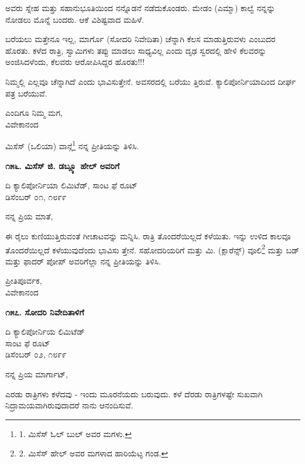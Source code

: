 ಅವರು ಸ್ನೇಹ ಮತ್ತು ಸಹಾನುಭೂತಿಯಿಂದ ನನ್ನೊಡನೆ ನಡೆದುಕೊಂಡರು. ಮೇಡಂ (ಎಮ್ಮಾ) ಕಾಲ್ವೆ ನನ್ನನ್ನು ನೋಡಲು ಮೊನ್ನೆ ಬಂದರು. ಆಕೆ ವಿಶಿಷ್ಟವಾದ ಮಹಿಳೆ.

ಬರೆಯಲು ಮತ್ತೇನೂ ಇಲ್ಲ, ಮಾರ್ಗೊ (ಸೋದರಿ ನಿವೇದಿತಾ) ಚೆನ್ನಾಗಿ ಕೆಲಸ ಮಾಡುತ್ತಿರುವಳು ಎಂಬುದರ ಹೊರತು. ಕಳೆದ ರಾತ್ರಿ, ಸ್ವಾಮಿಗಳು ತಪ್ಪು ಮಾಡಲು ಸಾಧ್ಯವಿಲ್ಲ ಎಂದು ದೃಢ ಸ್ವರದಲ್ಲಿ ಹೇಳಿ ಕೆಲವರನ್ನು ಅಂಜಿಸಿದಳೆಂದು, ಕೆಲವರು ಆರೋಪಿಸಿದ್ದರ ಹೊರತು!!!

ನಿಮ್ಮಲ್ಲಿ ಎಲ್ಲವೂ ಚೆನ್ನಾಗಿದೆ ಎಂದು ಭಾವಿಸುತ್ತೇನೆ. ಅವಸರದಲ್ಲಿ ಬರೆಯು ತ್ತಿರುವೆ. ಕ್ಯಾಲಿಪೋರ್ನಿಯಾದಿಂದ ದೀರ್ಘ ಪತ್ರ ಬರೆಯುವೆ.

\begin{flushright}
ಎಂದಿಗೂ ನಿಮ್ಮ ಮಗ,\\ವಿವೇಕಾನಂದ
\end{flushright}

ಮಿಸೆಸ್ (ಒಲಿಯಾ) ವಾನ್ಗೆ\footnote{1. ಮಿಸೆಸ್ ಓಲ್ ಬುಲ್ ಅವರ ಮಗಳು.} ನನ್ನ ಪ್ರೀತಿಯನ್ನು ತಿಳಿಸಿ.

\begin{center}
\textbf{೧೫೬. ಮಿಸೆಸ್ ಜಿ. ಡಬ್ಲ್ಯೂ ಹೇಲ್ ಅವರಿಗೆ}
\end{center}

\begin{flushright}
ದಿ ಕ್ಯಾಲಿಪೋರ್ನಿಯಾ ಲಿಮಿಟೆಡ್, ಸಾಂಟ ಫೆ ರೂಟ್\\ಡಿಸೆಂಬರ್ ೦೧, ೧೮೯೯
\end{flushright}

ನನ್ನ ಪ್ರಿಯ ಮಾತೆ,

ಈ ರೈಲು ಕುಣಿಯುತ್ತಿರುವಂತೆ ಗೀಚಾಟವನ್ನು ಮನ್ನಿಸಿ. ರಾತ್ರಿ ತೊಂದರೆಯಿಲ್ಲದೆ ಕಳೆಯಿತು. ಇನ್ನು ಉಳಿದ ಕಾಲವೂ ತೊಂದರೆಯಿಲ್ಲದೆ ಕಳೆಯುವುದೆಂದು ಭಾವಿಸು ತ್ತೇನೆ. ಸಹೋದರಿಯರಿಗೆ ಮತ್ತು ಮಿ. (ಕ್ಲಾರೆನ್ಸ್) ವೂಲಿ\footnote{2. ಮಿಸೆಸ್ ಹೇಲ್ ಅವರ ಮಗಳಾದ ಹಾರಿಯೆಟ್ಳ ಗಂಡ.} ಮತ್ತು ಬಡ್ ಮತ್ತು ಫಾದರ್ ಪೋಪ್ ಅವರಿಗೆಲ್ಲಾ ನನ್ನ ಪ್ರೀತಿಯನ್ನು ತಿಳಿಸಿ.

\begin{flushright}
ಪ್ರೀತಿಪೂರ್ವಕ,\\ವಿವೇಕಾನಂದ
\end{flushright}

\begin{center}
\textbf{೧೫೭. ಸೋದರಿ ನಿವೇದಿತಾಳಿಗೆ}
\end{center}

\begin{flushright}
ದಿ ಕ್ಯಾಲಿಪೋರ್ನಿಯ ಲಿಮಿಟೆಡ್\\ಸಾಂಟ ಫೆ ರೂಟ್\\ಡಿಸೆಂಬರ್ ೦೨, ೧೮೯೯
\end{flushright}

ನನ್ನ ಪ್ರಿಯ ಮಾರ್ಗಾಟ್,

ಎರಡು ರಾತ್ರಿಗಳು ಕಳೆದವು - ಇಂದು ಮೂರನೆಯದು ಬರುವುದು. ಕಳೆ ದೆರಡು ರಾತ್ರಿಗಳಷ್ಟೇ ಸುಖವಾಗಿ ನಿದ್ರಾಮಯವಾಗಿರುವುದಾದರೆ ನಾನು ಆನಂದಿಸುವೆ.

